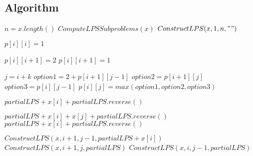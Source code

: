 \documentclass{article}
\begin{document}
    \subsection*{Algorithm}
        \begin{algorithm}[H]
            \begin{algorithmic}
                    \State $n = x.length()$
                    \State $ComputeLPSSubproblems(x)$
                    \State \Return $ConstructLPS(x, 1, n, "")$
                \EndProcedure

                        \State $p[i][i] = 1$
                    \EndFor

                            \State $p[i][i+1] = 2$
                        \Else
                            \State $p[i][i+1] = 1$
                        \EndIf
                    \EndFor

                            \State $j = i + k$
                                \State $option1 = 2 + p[i+1][j-1]$
                            \EndIf
                            \State $option2 = p[i+1][j]$
                            \State $option3 = p[i][j-1]$
                            \State $p[i][j] = max(option1, option2, option3)$
                        \EndFor
                    \EndFor
                \EndProcedure

                        \State \Return $partialLPS + x[i] + partialLPS.reverse()$
                    \EndIf
                    
                            \State \Return $partialLPS + x[i] + x[j] + partialLPS.reverse()$
                        \Else
                            \State \Return $partialLPS + x[i] + partialLPS.reverse()$
                        \EndIf
                    \EndIf
                    
                        \State \Return $ConstructLPS(x, i+1, j-1, partialLPS + x[i])$
                    \Else
                            \State \Return $ConstructLPS(x, i+1, j, partialLPS)$
                        \Else
                            \State \Return $ConstructLPS(x, i, j-1, partialLPS)$
                        \EndIf
                    \EndIf
                \EndProcedure
            \end{algorithmic}
        \end{algorithm}
\end{document}
